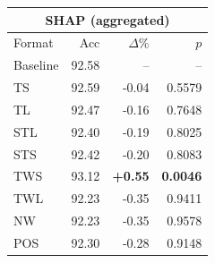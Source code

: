 \begin{tabular}{lrrr}
\toprule
\multicolumn{4}{c}{\textbf{SHAP (aggregated)}} \\
\midrule
Format & Acc & $\Delta$\% & $p$ \\
\midrule
Baseline & 92.58 & -- & -- \\
\midrule
TS & 92.59 & -0.04 & 0.5579 \\
TL & 92.47 & -0.16 & 0.7648 \\
STL & 92.40 & -0.19 & 0.8025 \\
STS & 92.42 & -0.20 & 0.8083 \\
TWS & 93.12 & \textbf{+0.55} & \textbf{0.0046} \\
TWL & 92.23 & -0.35 & 0.9411 \\
NW & 92.23 & -0.35 & 0.9578 \\
POS & 92.30 & -0.28 & 0.9148 \\
\bottomrule
\end{tabular}